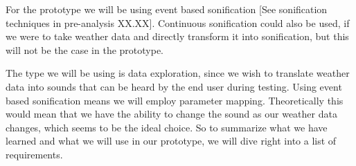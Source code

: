For the prototype we will be using event based sonification [See sonification techniques in pre-analysis XX.XX]. Continuous sonification could also be used, if we were to take weather data and directly transform it into sonification, but this will not be the case in the prototype. 

 The type we will be using is data exploration, since we wish to translate weather data into sounds that can be heard by the end user during testing.
Using event based sonification means we will employ parameter mapping. Theoretically this would mean that we have the ability to change the sound as our weather data changes, which seems to be the ideal choice.
So to summarize what we have learned and what we will use in our prototype, we will dive right into a list of requirements.




